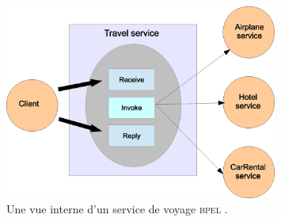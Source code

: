 \begin{figure}[h]
    \centering
    \includegraphics[width=0.8\textwidth]{figs/bpel-travel-example-shema.eps}
    \caption{Une vue interne d'un service de voyage \textsc{bpel}
      \cite{claro2006web}.}
    \label{fig:bpel-travel-example-schema}
\end{figure}
